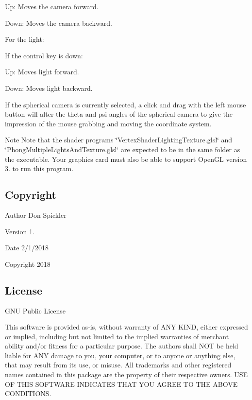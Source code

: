 \begin{DoxyItemize}
\item Up\+: Moves the camera forward.
\item Down\+: Moves the camera backward.
\end{DoxyItemize}

For the light\+:

If the control key is down\+:


\begin{DoxyItemize}
\item Up\+: Moves light forward.
\item Down\+: Moves light backward.
\end{DoxyItemize}

If the spherical camera is currently selected, a click and drag with the left mouse button will alter the theta and psi angles of the spherical camera to give the impression of the mouse grabbing and moving the coordinate system.

\begin{DoxyNote}{Note}
Note that the shader programs \char`\"{}\+Vertex\+Shader\+Lighting\+Texture.\+glsl\char`\"{} and \char`\"{}\+Phong\+Multiple\+Lights\+And\+Texture.\+glsl\char`\"{} are expected to be in the same folder as the executable. Your graphics card must also be able to support Open\+GL version 3. to run this program.
\end{DoxyNote}


\hypertarget{index_copyright}{}\subsection{Copyright}\label{index_copyright}
\begin{DoxyAuthor}{Author}
Don Spickler 
\end{DoxyAuthor}
\begin{DoxyVersion}{Version}
1. 
\end{DoxyVersion}
\begin{DoxyDate}{Date}
2/1/2018 
\end{DoxyDate}
\begin{DoxyCopyright}{Copyright}
2018
\end{DoxyCopyright}


\hypertarget{index_license}{}\subsection{License}\label{index_license}
G\+NU Public License

This software is provided as-\/is, without warranty of A\+NY K\+I\+ND, either expressed or implied, including but not limited to the implied warranties of merchant ability and/or fitness for a particular purpose. The authors shall N\+OT be held liable for A\+NY damage to you, your computer, or to anyone or anything else, that may result from its use, or misuse. All trademarks and other registered names contained in this package are the property of their respective owners. U\+SE OF T\+H\+IS S\+O\+F\+T\+W\+A\+RE I\+N\+D\+I\+C\+A\+T\+ES T\+H\+AT Y\+OU A\+G\+R\+EE TO T\+HE A\+B\+O\+VE C\+O\+N\+D\+I\+T\+I\+O\+NS. 